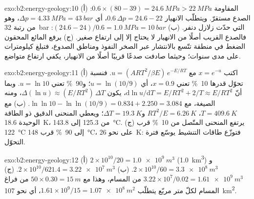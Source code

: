 \begin{solution}{exo:b2:energy-geology:10}
(أ) المقاومة $0.6 \times (80 - 39) = \qty{24.6}{MPa} > \qty{22}{MPa}$: الصدع مستقرّ. ويتطلّب الانهيار
$0.6\,\Delta p = 24.6 - 22$، أي $\Delta p = \qty{4.33}{MPa} = \qty{43}{bar}$، وهو من رتبة
\qty{32}{bar} التي حدّت زلازل دنفر. (ب) $(24.6 - 24)/0.6 = \qty{1.0}{MPa} =
\qty{10}{bar}$: فالصدع القريب أصلًا من الانهيار لا يحتاج إلا إلى ارتفاع صغير. (ج) يرفع المائع المحقون
الضغط في منطقة تتّسع بالانتشار عبر الصخر النفوذ ومناطق الصدوع، فتبلغ كيلومترات
على مدى سنوات؛ وحيثما صادفت صدعًا قريبًا أصلًا من الانهيار، يكفي ارتفاع متواضع.
\end{solution}

\begin{solution}{exo:b2:energy-geology:11}
(أ) اكتب $x = e^{-u}$ مع $u = (ART^2/\beta E)\,e^{-E/RT}$. فنسبة تحوّل قدرها
\qty{10}{\percent} تعني $x = 0.9$، أي $u = \ln(10/9)$؛ و\qty{90}{\percent} تعني $u = \ln 10$. وبما أنّ
$\mathrm{d}\ln u/\mathrm{d}T = E/RT^2 + 2/T \approx E/RT^2$، يكون $\Delta(\ln u) \approx (E/RT^2)\,\Delta T$،
ومنه الصيغة، مع $\ln\ln 10 - \ln\ln(10/9) = 0.834 + 2.250 = 3.084$. (ب) مع $T =
\qty{409.6}{K}$، $RT^2/E = \qty{6.26}{K}$ و$\Delta T = \qty{19.3}{K}$؛ ويعطي المنحنى الدقيق ذو الطاقة
الوحيدة \qty{18.6}{K}، من 125.3 إلى \qty{143.8}{\celsius}. (ج) يرتفع المنحنى المتّصل من
\qty{10}{\percent} قرب \qty{122}{\celsius} إلى \qty{90}{\percent} قرب \qty{148}{\celsius}، على نحو
\qty{26}{K}: فتوزّع طاقات التنشيط يوسّع فترة التحوّل.
\end{solution}

\begin{solution}{exo:b2:energy-geology:12}
(أ) $2 \times 10^{10}/20 = \qty{1.0e9}{m^3}$ (\qty{1.0}{km^3}) و$2 \times 10^{10}/60 =
\qty{3.3e8}{m^3}$. (ب) $2 \times 10^{10}/621.4 = \qty{3.22e7}{m^3}$. (ج) $3.22 \times 10^7/0.02 =
\qty{1.61e9}{m^3}$ من المسام، وهذا مع $50 \times 0.30 = \qty{15}{m}$ من فراغ المسام لكلّ متر
مربّع يتطلّب $1.61 \times 10^9/15 = \qty{1.07e8}{m^2}$، أي نحو \qty{107}{km^2}.
\end{solution}


